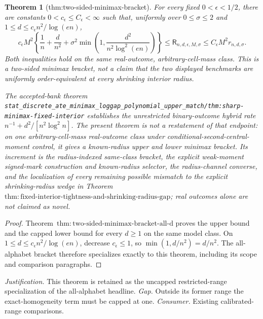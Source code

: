 \documentclass{article}
\newtheorem{theorem}{Theorem}
\begin{document}
\begin{theorem}[thm:two-sided-minimax-bracket]\label{thm:two-sided-minimax-bracket}
For every fixed \(0<\epsilon<1/2\), there are constants \(0<c_{\epsilon}\le C_{\epsilon}<\infty\) such that, uniformly over \(0\le\sigma\le2\) and \(1\le d\le c_{\epsilon}n^2/\log(en)\),
\[
 c_{\epsilon}M^2\left\{\frac1n+\frac d{n^2}+\sigma^2\min\left(1,\frac{d^2}{n^2\log^2(en)}\right)\right\}
 \le\mathsf R_{n,d,\epsilon,M,\sigma}
 \le C_{\epsilon}M^2r_{n,d,\sigma}.
\]
Both inequalities hold on the same real-outcome, arbitrary-cell-mass class.  This is a two-sided minimax bracket, not a claim that the two displayed benchmarks are uniformly order-equivalent at every shrinking interior radius.

The accepted-bank theorem \texttt{stat\_discrete\_ate\_minimax\_loggap\_polynomial\_upper\_match/thm:sharp-minimax-fixed-interior} establishes the unrestricted binary-outcome hybrid rate \(n^{-1}+d^2/[n^2\log^2 n]\).  The present theorem is not a restatement of that endpoint: on one arbitrary-cell-mass real-outcome class under conditional-second-central-moment control, it gives a known-radius upper and lower minimax bracket.  Its increment is the radius-indexed same-class bracket, the explicit weak-moment signed-mark construction and known-radius selector, the radius-channel converse, and the localization of every remaining possible mismatch to the explicit shrinking-radius wedge in Theorem~\(\mathrm{thm:fixed\text{-}interior\text{-}tightness\text{-}and\text{-}shrinking\text{-}radius\text{-}gap}\); real outcomes alone are not claimed as novel.
\end{theorem}
\begin{proof}
Theorem~\(\mathrm{thm:two\text{-}sided\text{-}minimax\text{-}bracket\text{-}all\text{-}d}\) proves the upper bound and the capped lower bound for every \(d\ge1\) on the same model class.  On \(1\le d\le c_{\epsilon}n^2/\log(en)\), decrease \(c_{\epsilon}\le1\), so \(\min(1,d/n^2)=d/n^2\).  The all-alphabet bracket therefore specializes exactly to this theorem, including its scope and comparison paragraphs.
\end{proof}
\par\smallskip\noindent \textit{Justification.} This theorem is retained as the uncapped restricted-range specialization of the all-alphabet headline. \textit{Gap.} Outside its former range the exact-homogeneity term must be capped at one. \textit{Consumer.} Existing calibrated-range comparisons.
\end{document}
